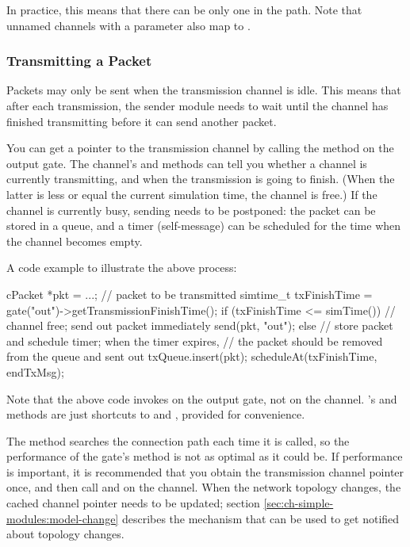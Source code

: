 \begin{note}
  In practice, this means that there can be only one 
  in the path. Note that unnamed channels with a  parameter
  also map to .
\end{note}

\subsubsection{Transmitting a Packet}

Packets may only be sent when the transmission channel is idle.
This means that after each transmission, the sender module needs
to wait until the channel has finished transmitting before it can
send another packet.

You can get a pointer to the transmission channel by calling the
 method on the output gate.
The channel's  and 
methods can tell you whether a channel is currently transmitting,
and when the transmission is going to finish. (When the latter is
less or equal the current simulation time, the channel is free.)
If the channel is currently busy, sending needs to be postponed:
the packet can be stored in a queue, and a timer (self-message) can be
scheduled for the time when the channel becomes empty.

A code example to illustrate the above process:

\begin{cpp}
cPacket *pkt = ...; // packet to be transmitted
simtime_t txFinishTime = gate("out")->getTransmissionFinishTime();
if (txFinishTime <= simTime())
{
    // channel free; send out packet immediately
    send(pkt, "out");
}
else
{
    // store packet and schedule timer; when the timer expires,
    // the packet should be removed from the queue and sent out
    txQueue.insert(pkt);
    scheduleAt(txFinishTime, endTxMsg);
}
\end{cpp}

Note that the above code invokes  on the
output gate, not on the channel. 's
 and  methods are just
shortcuts to  and
, provided for
convenience.

The  method searches the connection path each
time it is called, so the performance of the gate's
 method is not as optimal as it could be.
If performance is important, it is recommended that you obtain the
transmission channel pointer once, and then call  and
 on the channel. When the network topology
changes, the cached channel pointer needs to be updated; section
\ref{sec:ch-simple-modules:model-change} describes the mechanism that can
be used to get notified about topology changes.

